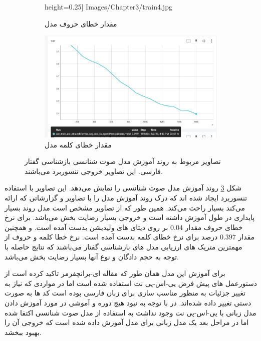 \begin{figure}[h]
\begin{subfigure}{0.5\textwidth}
                height=0.25\textheight]
                {Images/Chapter3/train4.jpg}
			\caption{مقدار خطای حروف مدل}
			\label{CER}
		\end{subfigure}\hfil %
		\begin{subfigure}{0.5\textwidth}
			\includegraphics[width=1.1\linewidth, 
                height=0.25\textheight]
                {Images/Chapter3/train5.jpg}
			\caption{مقدار خطای کلمه مدل}
			\label{WER}
		\end{subfigure}
		\caption{تصاویر مربوط به روند آموزش مدل صوت شنانسی بازشناسی گفتار 
  فارسی. این تصاویر خروجی تنسوربرد می‌باشند.}
		\label{fig:train}
\end{figure}

شکل \ref{fig:train} روند آموزش مدل صوت شنانسی را نمایش می‌دهد.
این تصاویر با استفاده تنسوربرد ایجاد شده اند که درک روند آموزش مدل را با تصاویر و گزارشاتی که ارائه می‌کند بسیار راحت می‌کند.\cite{tensorflow2015-whitepaper}
همین طور که از تصاویر مشخص است مدل روند بسیار پایداری در طول آموزش داشته است و خروجی بسیار رضایت بخش می‌باشد. برای نرخ خطای حروف
مقدار $0.04$ بر روی دیتای های ولیدیشن
بدست آمده است.
و همچنین مقدار $0.397$ درصد برای نرخ خطای کلمه بدست آمده است.
نرخ خطا کلمه و حروف
از مهمترین متریک های ارزیابی مدل های بازشناسی گفتار می‌باشند که نتایج حاصله با توجه به حجم دادگان و نوع آنها بسیار رضایت بخش می‌باشد.

برای آموزش این مدل همان طور که مقاله ای-برانچفرمر تاکید کرده است \cite{kim2022ebranchformer}
از دستورعمل های پیش فرض 
یی-اس-پی نت
استفاده شده است اما در مواردی که نیاز به تغییر جزئیات به منظور مناسب سازی برای زبان فارسی بوده است کد ها به صورت دستی تغییر داده شده‌اند. در با توجه به نبود هیچ دوره و آموشی در مورد آموزش دادن مدل زبانی با 
یی-اس-پی نت
وجود نداشت به استفاده از مدل صوت شنانسی اکتفا شده اما در مراحل بعد یک مدل زبانی برای مدل آموزش داده شده است که خروجی آن را بهبود ببخشد.

